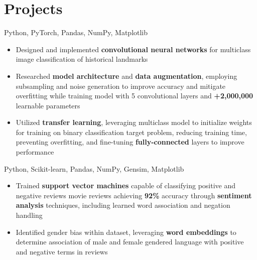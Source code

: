 \documentclass[letterpaper,11pt]{article}
\begin{document}
\section{Projects}
{Python, PyTorch, Pandas, NumPy, Matplotlib}{}
\begin{itemize}[leftmargin=*]
    \item \vspace{-3pt} \small Designed and implemented
          \textbf{convolutional neural networks} for multiclass image
          classification of historical landmarks
    \item \vspace{-7pt} \small Researched \textbf{model architecture}
          and \textbf{data augmentation}, employing subsampling and noise generation
          to improve accuracy and mitigate overfitting while training model
          with 5 convolutional layers and \textbf{+2,000,000} learnable parameters
    \item \vspace{-7pt} \small Utilized \textbf{transfer learning}, leveraging
          multiclass model to initialize weights
          for training on binary classification target problem, reducing
          training time, preventing overfitting, and
          fine-tuning \textbf{fully-connected} layers to improve performance
\end{itemize}
{Python, Scikit-learn, Pandas, NumPy, Gensim, Matplotlib}{}
\begin{itemize}[leftmargin=*]
    \item \vspace{-3pt} \small Trained \textbf{support vector
              machines} capable of classifying positive and negative reviews
          movie reviews achieving \textbf{92\%} accuracy
          through \textbf{sentiment analysis} techniques, including
          learned word association and negation handling
    \item \vspace{-7pt} \small Identified gender bias within dataset,
          leveraging \textbf{word embeddings} to determine
          association of male and female gendered language with positive and
          negative terms in reviews
\end{itemize}
\end{document}
